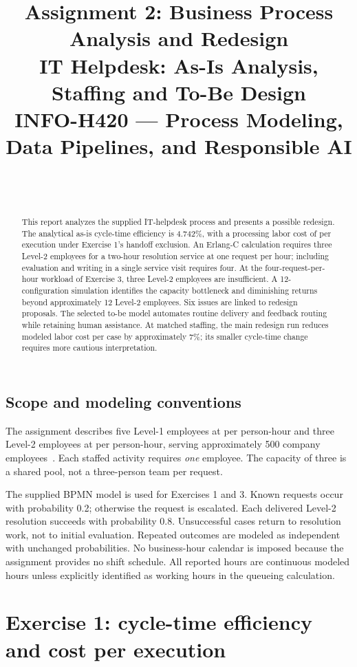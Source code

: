 \documentclass[10pt,a4paper]{article}
\title{\textbf{Assignment 2: Business Process Analysis and Redesign}\\[4pt]
\large IT Helpdesk: As-Is Analysis, Staffing and To-Be Design\\[3pt]
\normalsize INFO-H420 --- Process Modeling, Data Pipelines, and Responsible AI}
\author{\StudentOne\\\StudentTwo\\\StudentThree}
\date{}
\newcommand{\EUR}{\texteuro}
\begin{document}
\maketitle
\begin{abstract}
This report analyzes the supplied IT-helpdesk process and presents a possible redesign.
The analytical as-is cycle-time efficiency is 4.742\%, with a processing labor cost of
\EUR176.67 per execution under Exercise 1's handoff exclusion. An Erlang-C calculation
requires three Level-2 employees for a two-hour resolution service at one request per
hour; including evaluation and writing in a single service visit requires four.
At the four-request-per-hour workload of Exercise 3, three Level-2 employees are
insufficient. A 12-configuration simulation identifies the capacity bottleneck and
diminishing returns beyond approximately 12 Level-2 employees. Six issues are linked
to redesign proposals. The selected to-be model automates routine delivery and
feedback routing while retaining human assistance. At matched staffing, the main
redesign run reduces modeled labor cost per case by approximately 7\%; its smaller
cycle-time change requires more cautious interpretation.
\end{abstract}

\subsection*{Scope and modeling conventions}
The assignment describes five Level-1 employees at \EUR40 per person-hour and three
Level-2 employees at \EUR60 per person-hour, serving approximately 500 company
employees~\cite{assignment}. Each staffed activity requires \emph{one} employee.
The capacity of three is a shared pool, not a three-person team per request.

The supplied BPMN model is used for Exercises 1 and 3. Known requests occur with
probability 0.2; otherwise the request is escalated. Each delivered Level-2 resolution
succeeds with probability 0.8. Unsuccessful cases return to resolution work, not to
initial evaluation. Repeated outcomes are modeled as independent with unchanged
probabilities. No business-hour calendar is imposed because the assignment provides
no shift schedule. All reported hours are continuous modeled hours unless explicitly
identified as working hours in the queueing calculation.

\section{Exercise 1: cycle-time efficiency and cost per execution}
\end{document}
